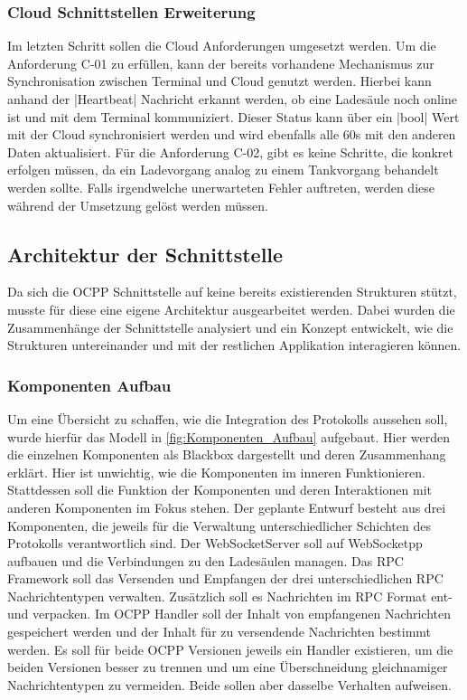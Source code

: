 \subsubsection{Cloud Schnittstellen Erweiterung}
Im letzten Schritt sollen die Cloud Anforderungen umgesetzt werden. Um die Anforderung C-01 zu erfüllen, kann der bereits vorhandene Mechanismus zur Synchronisation zwischen Terminal und Cloud genutzt werden. Hierbei kann anhand der \spverb|Heartbeat| Nachricht erkannt werden, ob eine Ladesäule noch online ist und mit dem Terminal kommuniziert. Dieser Status kann über ein \spverb|bool| Wert mit der Cloud synchronisiert werden und wird ebenfalls alle 60s mit den anderen Daten aktualisiert. Für die Anforderung C-02, gibt es keine Schritte, die konkret erfolgen müssen, da ein Ladevorgang analog zu einem Tankvorgang behandelt werden sollte. Falls irgendwelche unerwarteten Fehler auftreten, werden diese während der Umsetzung gelöst werden müssen. 

\subsection{Architektur der Schnittstelle}\label{OCPP_Architektur}
Da sich die OCPP Schnittstelle auf keine bereits existierenden Strukturen stützt, musste für diese eine eigene Architektur ausgearbeitet werden. Dabei wurden die Zusammenhänge der Schnittstelle analysiert und ein Konzept entwickelt, wie die Strukturen untereinander und mit der restlichen Applikation interagieren können.
\subsubsection{Komponenten Aufbau}
Um eine Übersicht zu schaffen, wie die Integration des Protokolls aussehen soll, wurde hierfür das Modell in \autoref{fig:Komponenten_Aufbau} aufgebaut. Hier werden die einzelnen Komponenten als Blackbox dargestellt und deren Zusammenhang erklärt. Hier ist unwichtig, wie die Komponenten im inneren Funktionieren. Stattdessen soll die Funktion der Komponenten und deren Interaktionen mit anderen Komponenten im Fokus stehen. Der geplante Entwurf besteht aus drei Komponenten, die jeweils für die Verwaltung unterschiedlicher Schichten des Protokolls verantwortlich sind. Der WebSocketServer soll auf WebSocketpp aufbauen und die Verbindungen zu den Ladesäulen managen. Das RPC Framework soll das Versenden und Empfangen der drei unterschiedlichen RPC Nachrichtentypen verwalten. Zusätzlich soll es Nachrichten im RPC Format ent- und verpacken. Im OCPP Handler soll der Inhalt von empfangenen Nachrichten gespeichert werden und der Inhalt für zu versendende Nachrichten bestimmt werden. Es soll für beide OCPP Versionen jeweils ein Handler existieren, um die beiden Versionen besser zu trennen und um eine Überschneidung gleichnamiger Nachrichtentypen zu vermeiden. Beide sollen aber dasselbe Verhalten aufweisen.\newline

